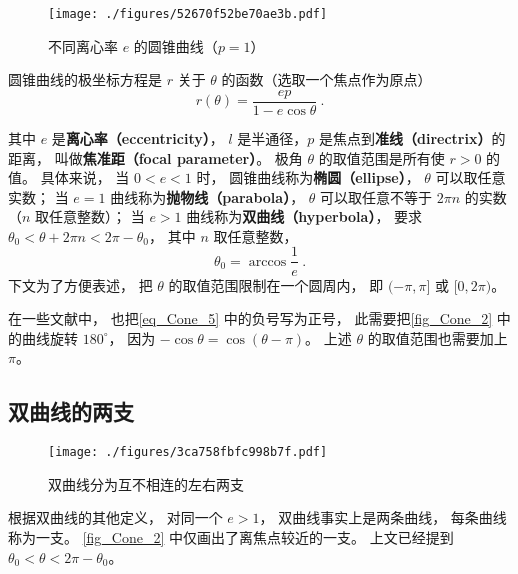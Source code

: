 

\begin{figure}[ht]
\centering
\texttt{[image: ./figures/52670f52be70ae3b.pdf]}
\caption{不同离心率 $e$ 的圆锥曲线（$p = 1$）} \label{fig_Cone_2}
\end{figure}

圆锥曲线的极坐标方程是 $r$ 关于 $\theta$ 的函数（选取一个焦点作为原点）
\begin{equation}\label{eq_Cone_3}
r(\theta) = \frac{ep}{1 - e\cos \theta }~.
\end{equation}



其中 $e$ 是\textbf{离心率（eccentricity）}， $l$ 是半通径，$p$ 是焦点到\textbf{准线（directrix）}的距离， 叫做\textbf{焦准距（focal parameter）}。 极角 $\theta$ 的取值范围是所有使 $r>0$ 的值。 具体来说， 当 $0 < e < 1$ 时， 圆锥曲线称为\textbf{椭圆（ellipse）}， $\theta$ 可以取任意实数； 当 $e = 1$ 曲线称为\textbf{抛物线（parabola）}， $\theta$ 可以取任意不等于 $2\pi n$ 的实数（$n$ 取任意整数）； 当 $e > 1$ 曲线称为\textbf{双曲线（hyperbola）}， 要求 $\theta_0< \theta + 2\pi n < 2\pi-\theta_0$， 其中 $n$ 取任意整数，
\begin{equation}
\theta_0 = \arccos\frac{1}{e}~.
\end{equation}
下文为了方便表述， 把 $\theta$ 的取值范围限制在一个圆周内， 即 $(-\pi,\pi]$ 或 $[0, 2\pi)$。



在一些文献中， 也把\autoref{eq_Cone_5} 中的负号写为正号， 此需要把\autoref{fig_Cone_2} 中的曲线旋转 $180^\circ$， 因为 $-\cos\theta = \cos(\theta - \pi)$。 上述 $\theta$ 的取值范围也需要加上 $\pi$。

\subsection{双曲线的两支}
\begin{figure}[ht]
\centering
\texttt{[image: ./figures/3ca758fbfc998b7f.pdf]}
\caption{双曲线分为互不相连的左右两支} \label{fig_Cone_3}
\end{figure}
根据双曲线的其他定义， 对同一个 $e>1$， 双曲线事实上是两条曲线， 每条曲线称为一支。 \autoref{fig_Cone_2} 中仅画出了离焦点较近的一支。 上文已经提到 $\theta_0< \theta < 2\pi-\theta_0$。

